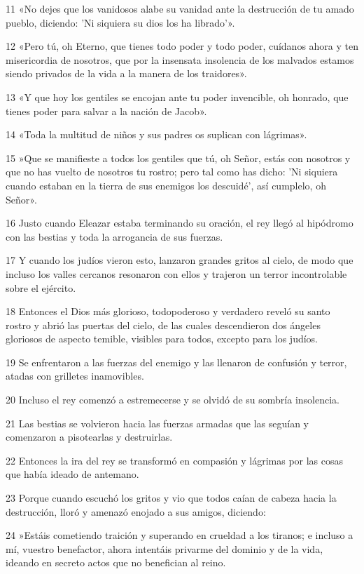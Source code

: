 \par 11 «No dejes que los vanidosos alabe su vanidad ante la destrucción de tu amado pueblo, diciendo: 'Ni siquiera su dios los ha librado'».
\par 12 «Pero tú, oh Eterno, que tienes todo poder y todo poder, cuídanos ahora y ten misericordia de nosotros, que por la insensata insolencia de los malvados estamos siendo privados de la vida a la manera de los traidores».
\par 13 «Y que hoy los gentiles se encojan ante tu poder invencible, oh honrado, que tienes poder para salvar a la nación de Jacob».
\par 14 «Toda la multitud de niños y sus padres os suplican con lágrimas».
\par 15 »Que se manifieste a todos los gentiles que tú, oh Señor, estás con nosotros y que no has vuelto de nosotros tu rostro; pero tal como has dicho: 'Ni siquiera cuando estaban en la tierra de sus enemigos los descuidé', así cumplelo, oh Señor».
\par 16 Justo cuando Eleazar estaba terminando su oración, el rey llegó al hipódromo con las bestias y toda la arrogancia de sus fuerzas.
\par 17 Y cuando los judíos vieron esto, lanzaron grandes gritos al cielo, de modo que incluso los valles cercanos resonaron con ellos y trajeron un terror incontrolable sobre el ejército.
\par 18 Entonces el Dios más glorioso, todopoderoso y verdadero reveló su santo rostro y abrió las puertas del cielo, de las cuales descendieron dos ángeles gloriosos de aspecto temible, visibles para todos, excepto para los judíos.
\par 19 Se enfrentaron a las fuerzas del enemigo y las llenaron de confusión y terror, atadas con grilletes inamovibles.
\par 20 Incluso el rey comenzó a estremecerse y se olvidó de su sombría insolencia.
\par 21 Las bestias se volvieron hacia las fuerzas armadas que las seguían y comenzaron a pisotearlas y destruirlas.
\par 22 Entonces la ira del rey se transformó en compasión y lágrimas por las cosas que había ideado de antemano.
\par 23 Porque cuando escuchó los gritos y vio que todos caían de cabeza hacia la destrucción, lloró y amenazó enojado a sus amigos, diciendo:
\par 24 »Estáis cometiendo traición y superando en crueldad a los tiranos; e incluso a mí, vuestro benefactor, ahora intentáis privarme del dominio y de la vida, ideando en secreto actos que no benefician al reino.
